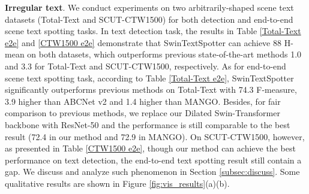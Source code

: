 \documentclass[10pt,twocolumn,letterpaper]{article}
\begin{document}
\begin{table*}[t!]
{\begin{tabular}{c|cccc|cc}
\end{tabular}}
\caption{Ablation studies on Total-Text without finetuning. ResNet-50 is used as the baseline backbone. TLSAM stands for the two-level self-attention mechanism. }
\label{Ablation}
\end{table*}


\textbf{Irregular text}. We conduct experiments on two arbitrarily-shaped scene text datasets (Total-Text and SCUT-CTW1500) for both detection and end-to-end scene text spotting tasks. In text detection task, the results in Table \ref{Total-Text e2e} and \ref{CTW1500 e2e} demonstrate that SwinTextSpotter can achieve 88 H-mean on both datasets, which outperforms previous state-of-the-art methods 1.0 and 3.3 for Total-Text and SCUT-CTW1500, respectively.
As for end-to-end scene text spotting task, according to Table \ref{Total-Text e2e}, SwinTextSpotter significantly outperforms previous methods on Total-Text with 74.3 F-measure, 3.9 higher than ABCNet v2 and 1.4 higher than MANGO. Besides, for fair comparison to previous methods, we replace our Dilated Swin-Transformer backbone with ResNet-50 and the performance is still comparable to the best result (72.4 in our method and 72.9 in MANGO). On SCUT-CTW1500, however, as presented in Table \ref{CTW1500 e2e}, though our method can achieve the best performance on text detection, the end-to-end text spotting result still contain a gap. We discuss and analyze such phenomenon in Section \ref{subsec:discuss}. Some qualitative results are shown in Figure \ref{fig:vis_results}(a)(b).

\begin{figure*}[h]
    \centering
    \caption{Visualization results of our method. White text represents the correct results; Red text represents the wrong results; Blue text represents that the GT of the text instance is marked as ``do not care". Best view in screen.}
    \label{fig:vis_results}
\end{figure*}
 
\end{document}
